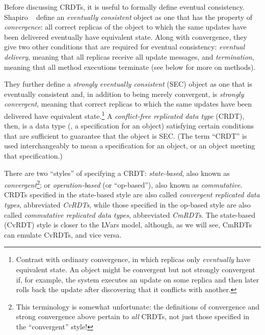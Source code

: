 \documentclass{article}
\begin{document}
Before discussing CRDTs, it is useful to formally define eventual
consistency.  Shapiro \etal~\cite{crdts} define an \emph{eventually
  consistent} object as one that has the property of
\emph{convergence}: all correct replicas of the object to which the
same updates have been delivered eventually have equivalent state.
Along with convergence, they give two other conditions that are
required for eventual consistency: \emph{eventual delivery}, meaning
that all replicas receive all update messages, and \emph{termination},
meaning that all method executions terminate (see below for more on
methods).

They further define a \emph{strongly eventually consistent} (SEC)
object as one that is eventually consistent and, in addition to being
merely convergent, is \emph{strongly convergent}, meaning that correct
replicas to which the same updates have been delivered have equivalent
state.\footnote{Contrast with ordinary convergence, in which replicas
  only \emph{eventually} have equivalent state.  An object might be
  convergent but not strongly convergent if, for example, the system
  executes an update on some replica and then later rolls back the
  update after discovering that it conflicts with another.}  A
\emph{conflict-free replicated data type} (CRDT), then, is a data type
(\ie, a specification for an object) satisfying certain conditions
that are sufficient to guarantee that the object is SEC.  (The term
``CRDT'' is used interchangeably to mean a specification for an
object, or an object meeting that specification.)

There are two ``styles'' of specifying a CRDT: \emph{state-based},
also known as \emph{convergent}\footnote{This terminology is somewhat
  unfortunate: the definitions of convergence and strong convergence
  above pertain to \emph{all} CRDTs, not just those specified in the
  ``convergent'' style!}; or \emph{operation-based} (or ``op-based''),
also known as \emph{commutative}.  CRDTs specified in the state-based
style are also called \emph{convergent replicated data types},
abbreviated \emph{CvRDTs}, while those specified in the op-based style
are also called \emph{commutative replicated data types}, abbreviated
\emph{CmRDTs}.  The state-based (CvRDT) style is closer to the LVars
model, although, as we will see, CmRDTs can emulate CvRDTs, and vice
versa.

\end{document}

